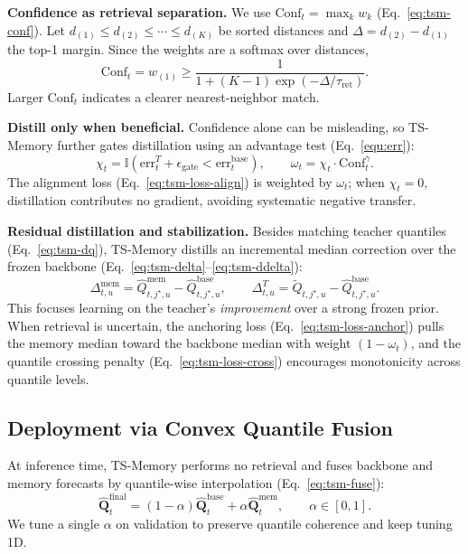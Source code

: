 \noindent\textbf{Confidence as retrieval separation.}
We use $\mathrm{Conf}_t=\max_k w_k$ (Eq.~\ref{eq:tsm-conf}). Let $d_{(1)}\le d_{(2)}\le\cdots\le d_{(K)}$ be
sorted distances and $\Delta=d_{(2)}-d_{(1)}$ the top-1 margin. Since the weights are a softmax over distances,
\begin{equation}
\mathrm{Conf}_t = w_{(1)}
\ge \frac{1}{1+(K-1)\exp(-\Delta/\tau_{\text{ret}})}.
\label{eq:conf-margin}
\end{equation}
Larger $\mathrm{Conf}_t$ indicates a clearer nearest-neighbor match.

\noindent\textbf{Distill only when beneficial.}
Confidence alone can be misleading, so TS-Memory further gates distillation using an advantage test
(Eq.~\ref{equ:err}):
\begin{equation}
\chi_t
=
\mathbb{I}\!\left(
\mathrm{err}^{T}_t + \epsilon_{\text{gate}}
<
\mathrm{err}^{\text{base}}_t
\right),
\qquad
\omega_t
=
\chi_t \cdot \mathrm{Conf}_t^{\gamma}.
\end{equation}
The alignment loss (Eq.~\ref{eq:tsm-loss-align}) is weighted by $\omega_t$; when $\chi_t=0$, distillation
contributes no gradient, avoiding systematic negative transfer.

\noindent\textbf{Residual distillation and stabilization.}
Besides matching teacher quantiles (Eq.~\ref{eq:tsm-dq}), TS-Memory distills an incremental median correction
over the frozen backbone (Eq.~\ref{eq:tsm-delta}--\ref{eq:tsm-ddelta}):
\[
\Delta^{\text{mem}}_{t,u}
=
\widehat{Q}^{\text{mem}}_{t,j^\star,u}
-
\widehat{Q}^{\text{base}}_{t,j^\star,u},
\qquad
\Delta^{T}_{t,u}
=
\widetilde{Q}_{t,j^\star,u}
-
\widehat{Q}^{\text{base}}_{t,j^\star,u}.
\]
This focuses learning on the teacher's \emph{improvement} over a strong frozen prior. When retrieval is
uncertain, the anchoring loss (Eq.~\ref{eq:tsm-loss-anchor}) pulls the memory median toward the backbone
median with weight $(1-\omega_t)$, and the quantile crossing penalty (Eq.~\ref{eq:tsm-loss-cross}) encourages
monotonicity across quantile levels.

\subsection{Deployment via Convex Quantile Fusion}
\label{subsec:deployment}

At inference time, TS-Memory performs no retrieval and fuses backbone and memory forecasts by quantile-wise
interpolation (Eq.~\ref{eq:tsm-fuse}):
\begin{equation}
\widehat{\mathbf{Q}}^{\text{final}}_t
=
(1-\alpha)\widehat{\mathbf{Q}}^{\text{base}}_t
+
\alpha \widehat{\mathbf{Q}}^{\text{mem}}_t,
\qquad
\alpha\in[0,1].
\end{equation}
We tune a single $\alpha$ on validation to preserve quantile coherence and keep tuning 1D.

